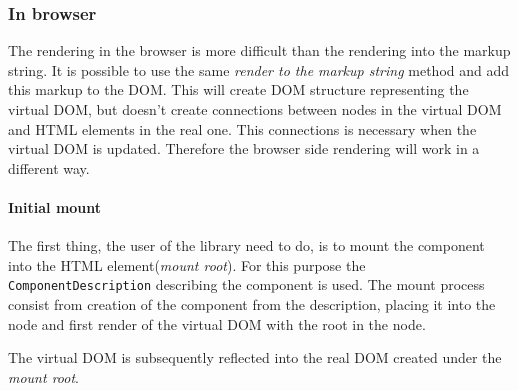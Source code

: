    \subsubsection{In browser}\label{subsec:our-architecture-rendering-browser}

      The rendering in the browser is more difficult than the rendering into the markup string. 
      It is possible to use the same \textit{render to the markup string} method and add this markup to the DOM. 
      This will create DOM structure representing the virtual DOM, 
      but doesn't create connections between nodes in the virtual DOM and HTML elements in the real one. 
      This connections is necessary when the virtual DOM is updated.
      Therefore the browser side rendering will work in a different way. 

      \paragraph{Initial mount}\label{par:our-architecture-rendering-browser-init} 

        The first thing, the user of the library need to do, is to mount the component into the HTML element(\textit{mount root}). 
        For this purpose the \texttt{ComponentDescription} describing the component is used.
        The mount process consist from creation of the component from the description, 
        placing it into the node and first render of the virtual DOM with the root in the node. 

        The virtual DOM is subsequently reflected into the real DOM created under the \textit{mount root}.

